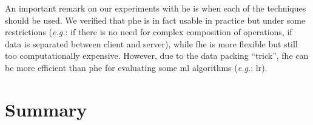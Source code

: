 An important remark on our experiments with \ac{he} is when each of the techniques should be used. We verified that \ac{phe} is in fact usable in practice but under some restrictions (\textit{e.g.}: if there is no need for complex composition of operations, if data is separated between client and server), while \ac{fhe} is more flexible but still too computationally expensive. However, due to the data packing ``trick'', \ac{fhe} can be more efficient than \ac{phe} for evaluating some \ac{ml} algorithms (\textit{e.g.}: \ac{lr}).





\section{Summary}
\label{sec:SummaryEvaluation}






